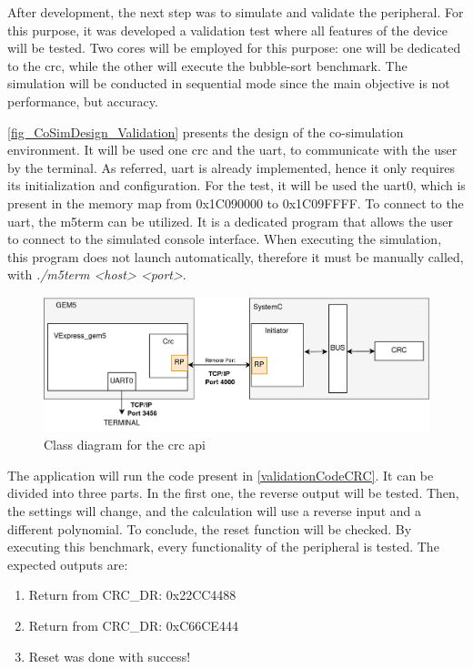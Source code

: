 After development, the next step was to simulate and validate the peripheral. For this purpose, it was developed a validation test where
all features of the device will be tested. Two cores will be employed for this purpose: one will be dedicated to the 
\gls{crc}, while the other will execute the bubble-sort benchmark. The simulation will be conducted in sequential mode since 
the main objective is not performance, but accuracy.

\autoref{fig_CoSimDesign_Validation} presents the design of the co-simulation environment. 
It will be used one \gls{crc} and the \gls{uart}, to communicate with the user by the terminal.
As referred, \gls{uart} is already implemented, hence it only requires its initialization and configuration. For the test, it will be used the 
\gls{uart}0, which is present in the memory map from 0x1C090000 to 0x1C09FFFF.
To connect to the \gls{uart}, the m5term can be utilized. It is
a dedicated program that allows the user to connect to the simulated console interface. When executing the simulation, this program does not
launch automatically, therefore it must be manually called, with \textit{./m5term <host> <port>}.

\begin{figure}[H]
	\centering
 	\includegraphics[width=0.8\linewidth]{Images/CoSimDesign_Validation.png} 
 	\caption{Class diagram for the \gls{crc} \gls{api}}
	\label{fig_CoSimDesign_Validation}
\end{figure}

The application will run the code present in \ref{validationCodeCRC}. It can be divided into three parts. In the first one, the reverse 
output will be tested. Then, the settings will change, and the calculation will use a reverse input and a different polynomial. To
conclude, the reset function will be checked. By executing this benchmark, every functionality of the peripheral is tested. The expected
outputs are:

\begin{enumerate}
	\item Return from CRC\_DR: 0x22CC4488
	\item Return from CRC\_DR: 0xC66CE444
	\item Reset was done with success!
\end{enumerate}

